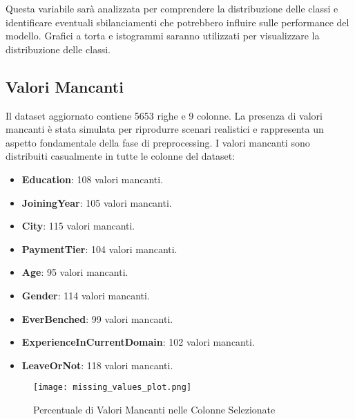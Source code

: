 \documentclass[a4paper,12pt]{article}
\begin{document}
Questa variabile sarà analizzata per comprendere la distribuzione delle classi e identificare eventuali sbilanciamenti che potrebbero influire sulle performance del modello. Grafici a torta e istogrammi saranno utilizzati per visualizzare la distribuzione delle classi.

\subsection{Valori Mancanti}



Il dataset aggiornato contiene 5653 righe e 9 colonne. La presenza di valori mancanti è stata simulata per riprodurre scenari realistici e rappresenta un aspetto fondamentale della fase di preprocessing. I valori mancanti sono distribuiti casualmente in tutte le colonne del dataset:
\begin{itemize}
    \item \textbf{Education}: 108 valori mancanti.
    \item \textbf{JoiningYear}: 105 valori mancanti.
    \item \textbf{City}: 115 valori mancanti.
    \item \textbf{PaymentTier}: 104 valori mancanti.
    \item \textbf{Age}: 95 valori mancanti.
    \item \textbf{Gender}: 114 valori mancanti.
    \item \textbf{EverBenched}: 99 valori mancanti.
    \item \textbf{ExperienceInCurrentDomain}: 102 valori mancanti.
    \item \textbf{LeaveOrNot}: 118 valori mancanti.
\end{itemize}

\begin{figure}[H]
    \centering
    \texttt{[image: missing\_values\_plot.png]}
    \caption{Percentuale di Valori Mancanti nelle Colonne Selezionate}
    \label{fig:missing_values}
\end{figure}
\end{document}

